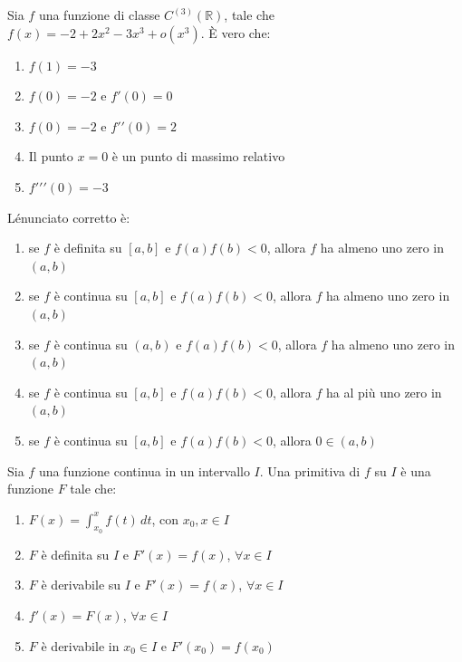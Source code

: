\begin{quiz}
Sia $f$ una funzione di classe $C^{(3)}(\mathbb R)$, tale che $f(x)=-2+2x^2-3x^3+o(x^3)$. \`E vero che:
\begin{enumerate}
\item $f(1)=-3$
\item $f(0)=-2$ e $f\prime(0)=0$
\item $f(0)=-2$ e $f\prime\prime(0)=2$
\item Il punto $x=0$ \`e un punto di massimo relativo
\item $f\prime\prime\prime(0)=-3$
\end{enumerate}
\end{quiz}

\begin{quiz}
L\'enunciato corretto \`e:
\begin{enumerate}
\item se $f$ \`e definita su $[a,b]$ e $f(a)f(b)<0$, allora $f$ ha almeno uno zero in $(a,b)$
\item se $f$ \`e continua su $[a,b]$ e $f(a)f(b)<0$, allora $f$ ha almeno uno zero in $(a,b)$
\item se $f$ \`e continua su $(a,b)$ e $f(a)f(b)<0$, allora $f$ ha almeno uno zero in $(a,b)$
\item se $f$ \`e continua su $[a,b]$ e $f(a)f(b)<0$, allora $f$ ha al pi\`u uno zero in $(a,b)$
\item se $f$ \`e continua su $[a,b]$ e $f(a)f(b)<0$, allora $0\in(a,b)$
\end{enumerate}
\end{quiz}

\begin{quiz}
Sia $f$ una funzione continua in un intervallo $I$. Una primitiva di $f$ su $I$ \`e una funzione $F$ tale che:
\begin{enumerate}
\item $F(x)=\int_{x_0}^x f(t)\,dt$, con $x_0,x\in I$
\item $F$ \`e definita su $I$ e $F\prime(x)=f(x)$, $\forall x\in I$
\item $F$ \`e derivabile su $I$ e $F\prime(x)=f(x)$, $\forall x\in I$
\item $f\prime(x)=F(x)$, $\forall x\in I$
\item $F$ \`e derivabile in $x_0\in I$ e $F\prime(x_0)=f(x_0)$
\end{enumerate}
\end{quiz}

